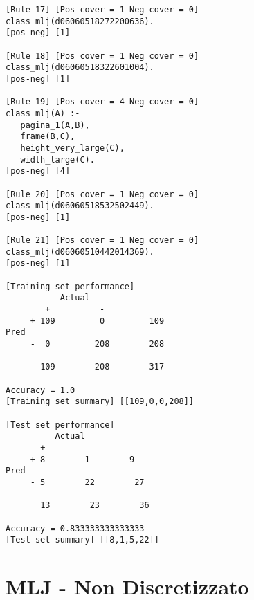 \begin{multicols}{2}
\begin{verbatim}
[Rule 17] [Pos cover = 1 Neg cover = 0]
class_mlj(d06060518272200636).
[pos-neg] [1]

[Rule 18] [Pos cover = 1 Neg cover = 0]
class_mlj(d06060518322601004).
[pos-neg] [1]

[Rule 19] [Pos cover = 4 Neg cover = 0]
class_mlj(A) :-
   pagina_1(A,B),
   frame(B,C),
   height_very_large(C),
   width_large(C).
[pos-neg] [4]

[Rule 20] [Pos cover = 1 Neg cover = 0]
class_mlj(d06060518532502449).
[pos-neg] [1]

[Rule 21] [Pos cover = 1 Neg cover = 0]
class_mlj(d06060510442014369).
[pos-neg] [1]

[Training set performance]
           Actual
        +          -  
     + 109         0         109 
Pred 
     -  0         208        208 

       109        208        317 

Accuracy = 1.0
[Training set summary] [[109,0,0,208]]

[Test set performance]
          Actual
       +        - 
     + 8        1        9 
Pred 
     - 5        22        27 

       13        23        36 

Accuracy = 0.833333333333333
[Test set summary] [[8,1,5,22]]
	\end{verbatim}
\end{multicols}

\section{MLJ - Non Discretizzato}
